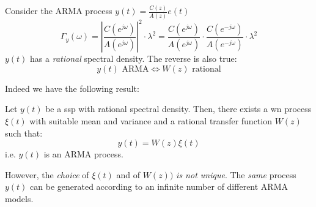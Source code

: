 \begin{example}
Consider the ARMA process $y(t)=\frac{C(z)}{A(z)}e(t)$
\[
	\Gamma _{y}(\omega )=\left|\frac{C(e^{j\omega})}{A(e^{j\omega})}\right|^2 \cdot\lambda^2 =\frac{C(e^{j\omega})}{A(e^{j\omega} )} \cdot \frac{C(e^{-j\omega})}{A(e^{-j\omega} )}\cdot\lambda^2 
\]
$y(t)$ has a \emph{rational} spectral density. The reverse is also true:
\[
	y(t) \text{ ARMA} \iff W(z) \text{ rational}
\]
\end{example}
Indeed we have the following result:
\begin{theorem}
	Let $y(t)$ be a \gls{ssp} with rational spectral density.
	Then, there exists a \gls{wn} process $\xi(t)$ with suitable mean and variance and a rational transfer function $W(z)$ such that:
	\[
		y(t)=W(z)\xi(t)
	\]
	i.e. $y(t)$ is an ARMA process.
\end{theorem}

However, the \emph{choice} of $\xi(t)$ and of $W(z))$ \emph{is not unique}.
The \emph{same} process $y(t)$ can be generated according to an infinite number of different ARMA models.

